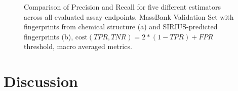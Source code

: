 \begin{figure}[htbp]
\begin{subfigure}[b]{0.495\textwidth}
      \caption{}
      \label{fig:hitcall_classification_Feature_Selection_XGBClassifier_mb_val_sirius_optimal_macro_avg}
  \end{subfigure}
  \caption{Comparison of Precision and Recall for five different estimators across all evaluated assay endpoints. MassBank Validation Set with fingerprints from chemical structure (a) and SIRIUS-predicted fingerprints (b), $\text{cost}(TPR, TNR) = 2 * (1 - TPR) + FPR$ threshold, macro averaged metrics.}
  \label{fig:hitcall_classification_Feature_Selection_XGBClassifier_mb_val_optimal_macro_avg}
\end{figure}





\section{Discussion}









